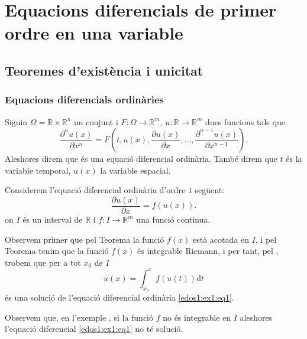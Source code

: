 \documentclass[../Apunts.tex]{subfiles}
\begin{document}
\chapter{Equacions diferencials de primer ordre en una variable}
	\section{Teoremes d'existència i unicitat}
	\subsection{Equacions diferencials ordinàries}
	\begin{definition}
		\label{def:equació diferencial ordinària d'ordre n}
		\label{def:solució de l'equació diferencial ordinària}
		Siguin \(\Omega=\mathbb{R}\times\mathbb{R}^{n}\) un conjunt i \(F\colon\Omega\longrightarrow\mathbb{R}^{m}\), \(u\colon\mathbb{R}\longrightarrow\mathbb{R}^{m}\) dues funcions tals que
		\[\frac{\partial^{n}u(x)}{\partial x^{n}}=F\left(t,u(x),\frac{\partial u(x)}{\partial x},\dots,\frac{\partial^{n-1}u(x)}{\partial x^{n-1}}\right).\]
		Aleshores direm que
		és una equació diferencial ordinària. També direm que \(t\) és la variable temporal, \(u(x)\) la variable espacial.
	\end{definition}
	\begin{example}
		\label{ex:edos1:1}
		Considerem l'equació diferencial ordinària d'ordre \(1\) següent:
		\begin{equation}
			\label{edos1:ex1:eq1}
			\frac{\partial u(x)}{\partial x}=f(u(x)).
		\end{equation}
		on \(I\) és un interval de \(\mathbb{R}\) i \(f\colon I\longrightarrow\mathbb{R}^{m}\) una funció contínua.
		\begin{solution}
			Observem primer que pel Teorema  la funció \(f(x)\) està acotada en \(I\), i pel Teorema  tenim que la funció \(f(x)\) és integrable Riemann, i per tant, pel , trobem que per a tot \(x_{0}\) de \(I\)
			\[u(x)=\int_{x_{0}}^{x}f(u(t))\text{d}t\]
			és una solució de l'equació diferencial ordinària \eqref{edos1:ex1:eq1}.
		\end{solution}
	\end{example}
	\begin{observation}
		Observem que, en l'exemple , si la funció \(f\) no és integrable en \(I\) aleshores l'equació diferencial \eqref{edos1:ex1:eq1} no té solució. %
	\end{observation}
\end{document}
